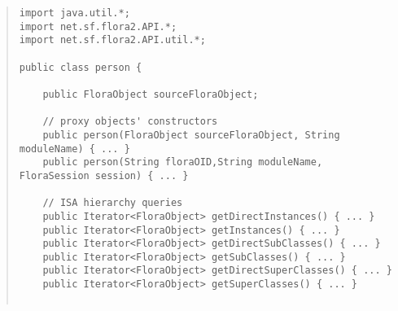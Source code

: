 \begin{quote}
\begin{verbatim}
import java.util.*;
import net.sf.flora2.API.*;
import net.sf.flora2.API.util.*;

public class person {

    public FloraObject sourceFloraObject;

    // proxy objects' constructors
    public person(FloraObject sourceFloraObject, String moduleName) { ... }
    public person(String floraOID,String moduleName, FloraSession session) { ... }

    // ISA hierarchy queries
    public Iterator<FloraObject> getDirectInstances() { ... }
    public Iterator<FloraObject> getInstances() { ... }
    public Iterator<FloraObject> getDirectSubClasses() { ... }
    public Iterator<FloraObject> getSubClasses() { ... }
    public Iterator<FloraObject> getDirectSuperClasses() { ... }
    public Iterator<FloraObject> getSuperClasses() { ... }


\end{verbatim}
\end{quote}
